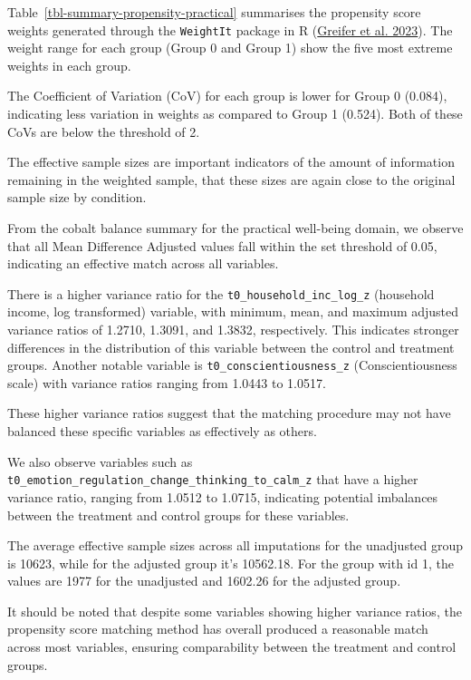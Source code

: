\documentclass[
  singlecolumn]{report}
\begin{document}
Table~\ref{tbl-summary-propensity-practical} summarises the propensity
score weights generated through the \texttt{WeightIt} package in R
(\protect\hyperlink{ref-greifer2023}{Greifer et al. 2023}). The weight
range for each group (Group 0 and Group 1) show the five most extreme
weights in each group.

The Coefficient of Variation (CoV) for each group is lower for Group 0
(0.084), indicating less variation in weights as compared to Group 1
(0.524). Both of these CoVs are below the threshold of 2.

The effective sample sizes are important indicators of the amount of
information remaining in the weighted sample, that these sizes are again
close to the original sample size by condition.

From the cobalt balance summary for the practical well-being domain, we
observe that all Mean Difference Adjusted values fall within the set
threshold of 0.05, indicating an effective match across all variables.

There is a higher variance ratio for the
\texttt{t0\_household\_inc\_log\_z} (household income, log transformed)
variable, with minimum, mean, and maximum adjusted variance ratios of
1.2710, 1.3091, and 1.3832, respectively. This indicates stronger
differences in the distribution of this variable between the control and
treatment groups. Another notable variable is
\texttt{t0\_conscientiousness\_z} (Conscientiousness scale) with
variance ratios ranging from 1.0443 to 1.0517.

These higher variance ratios suggest that the matching procedure may not
have balanced these specific variables as effectively as others.

We also observe variables such as
\texttt{t0\_emotion\_regulation\_change\_thinking\_to\_calm\_z} that
have a higher variance ratio, ranging from 1.0512 to 1.0715, indicating
potential imbalances between the treatment and control groups for these
variables.

The average effective sample sizes across all imputations for the
unadjusted group is 10623, while for the adjusted group it's 10562.18.
For the group with id 1, the values are 1977 for the unadjusted and
1602.26 for the adjusted group.

It should be noted that despite some variables showing higher variance
ratios, the propensity score matching method has overall produced a
reasonable match across most variables, ensuring comparability between
the treatment and control groups.
\end{document}
